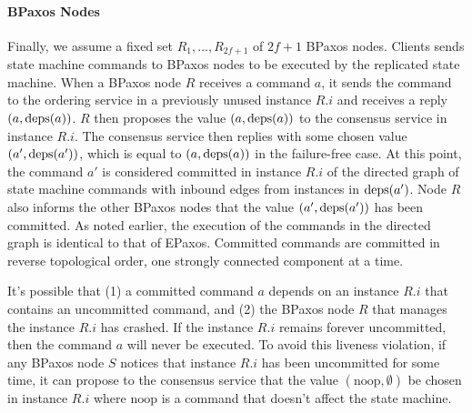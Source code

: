 \documentclass{mwhittaker}
\begin{document}
\paragraph{BPaxos Nodes}
Finally, we assume a fixed set $R_1, \ldots, R_{2f+1}$ of $2f + 1$ BPaxos
nodes.
%
Clients sends state machine commands to BPaxos nodes to be executed by the
replicated state machine. When a BPaxos node $R$ receives a command $a$, it
sends the command to the ordering service in a previously unused instance $R.i$
and receives a reply $(a, \text{deps}(a))$. $R$ then proposes the value $(a,
\text{deps}(a))$ to the consensus service in instance $R.i$. The consensus service
then replies with some chosen value $(a', \text{deps}(a'))$, which is equal to $(a,
\text{deps}(a))$ in the failure-free case. At this point, the command $a'$ is
considered committed in instance $R.i$ of the directed graph of state machine
commands with inbound edges from instances in $\text{deps}(a')$. Node $R$ also
informs the other BPaxos nodes that the value $(a', \text{deps}(a'))$ has been
committed. As noted earlier, the execution of the commands in the directed
graph is identical to that of EPaxos. Committed commands are committed in
reverse topological order, one strongly connected component at a time.

\newcommand{\noop}{\text{noop}}
It's possible that (1) a committed command $a$ depends on an instance $R.i$
that contains an uncommitted command, and (2) the BPaxos node $R$ that manages
the instance $R.i$ has crashed. If the instance $R.i$ remains forever
uncommitted, then the command $a$ will never be executed. To avoid this
liveness violation, if any BPaxos node $S$ notices that instance $R.i$ has been
uncommitted for some time, it can propose to the consensus service that the
value $(\noop, \emptyset)$ be chosen in instance $R.i$ where $\noop$ is a
command that doesn't affect the state machine.

\end{document}
